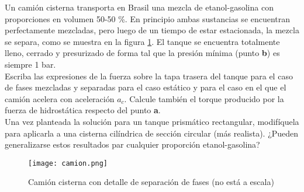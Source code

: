 \item Un camión cisterna transporta en Brasil una mezcla de etanol-gasolina
con proporciones en volumen 50-50 \%. En principio ambas sustancias se encuentran
perfectamente mezcladas, pero luego de un tiempo de estar estacionada, la mezcla
se separa, como se muestra en la figura \ref{fig:tanque}.
El tanque se encuentra totalmente lleno, cerrado y presurizado de forma tal que
la presión mínima (punto \textbf{b}) es siempre 1 bar.
\\
Escriba las expresiones de la fuerza sobre la tapa trasera del tanque
para el caso de fases mezcladas y separadas para el caso estático y para el caso
en el que el camión acelera con aceleración $a_c$. Calcule también el torque
producido por la fuerza de hidrostática respecto del punto \textbf{a}.
\\
Una vez planteada la solución para un tanque prismático rectangular, modifíquela
para aplicarla a una cisterna cilíndrica de sección circular (más realista).
¿Pueden generalizarse estos resultados par cualquier proporción etanol-gasolina?

\begin{figure}[h!!!!]
  \centering
  \texttt{[image: camion.png]}
  \caption{Camión cisterna con detalle de separación de fases (no está a escala)}
  \label{fig:tanque}
\end{figure}



